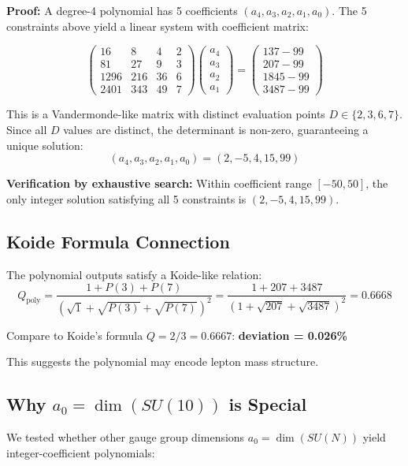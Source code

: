 \documentclass[11pt,a4paper]{article}
\begin{document}
\textbf{Proof:} A degree-4 polynomial has 5 coefficients $(a_4, a_3, a_2, a_1, a_0)$. The 5 constraints above yield a linear system with coefficient matrix:

\[
\begin{pmatrix}
16 & 8 & 4 & 2 \\
81 & 27 & 9 & 3 \\
1296 & 216 & 36 & 6 \\
2401 & 343 & 49 & 7
\end{pmatrix}
\begin{pmatrix}
a_4 \\ a_3 \\ a_2 \\ a_1
\end{pmatrix}
=
\begin{pmatrix}
137 - 99 \\
207 - 99 \\
1845 - 99 \\
3487 - 99
\end{pmatrix}
\]

This is a Vandermonde-like matrix with distinct evaluation points $D \in \{2, 3, 6, 7\}$. Since all $D$ values are distinct, the determinant is non-zero, guaranteeing a unique solution:
\[
(a_4, a_3, a_2, a_1, a_0) = (2, -5, 4, 15, 99)
\]

\textbf{Verification by exhaustive search:} Within coefficient range $[-50, 50]$, the only integer solution satisfying all 5 constraints is $(2, -5, 4, 15, 99)$.

\subsection{Koide Formula Connection}

The polynomial outputs satisfy a Koide-like relation:
\[
Q_{\text{poly}} = \frac{1 + P(3) + P(7)}{(\sqrt{1} + \sqrt{P(3)} + \sqrt{P(7)})^2} = \frac{1 + 207 + 3487}{(1 + \sqrt{207} + \sqrt{3487})^2} = 0.6668
\]

Compare to Koide's formula $Q = 2/3 = 0.6667$: \textbf{deviation = 0.026\%}

This suggests the polynomial may encode lepton mass structure.

\subsection{Why $a_0 = \dim(SU(10))$ is Special}

We tested whether other gauge group dimensions $a_0 = \dim(SU(N))$ yield integer-coefficient polynomials:
\end{document}
